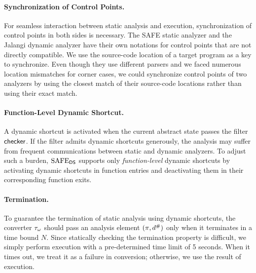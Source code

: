 \paragraph{Synchronization of Control Points.}
For seamless interaction between static analysis and {\sealed} execution,
synchronization of control points in both sides is necessary.
The SAFE static analyzer and the Jalangi dynamic analyzer
have their own notations for control points that are not directly
compatible.
We use the source-code location of a target program as a key to synchronize.
Even though they use different parsers and we faced numerous location mismatches for corner cases,
we could synchronize control points of two analyzers by using the closest match
of their source-code locations rather than using their exact match.

\paragraph{Function-Level Dynamic Shortcut.}
A dynamic shortcut is activated when the current abstract state passes the
filter $\textsf{checker}$.  If the filter admits dynamic shortcuts generously, the
analysis may suffer from frequent communications between static and dynamic
analyzers.  To adjust such a burden, $\text{SAFE}_{\textsf{DS}}$ supports only \textit{function-level} dynamic
shortcuts by activating dynamic shortcuts in function entries and deactivating them
in their corresponding function exits.

\paragraph{Termination.}
To guarantee the termination of static analysis using dynamic shortcuts, the
converter ${\tau}_\omega$ should pass an analysis element $(\pi, {d}^{\#})$
only when it terminates in a time bound $N$.  Since statically checking the
termination property is difficult, we simply perform {\sealed}
execution with a pre-determined time limit of 5 seconds.
When it times out, we treat it as a failure in conversion;
otherwise, we use the result of {\sealed} execution.




